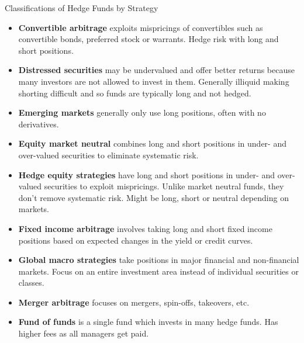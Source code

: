 \documentclass[../custom]{flashcards}
\newcommand{\studyArea}{Alternative Investments}
\begin{document}
\begin{flashcard}[\studyArea]{Classifications of Hedge Funds by Strategy}
    \begin{itemize}[itemsep=.5\itemsep]
        \item \textbf{Convertible arbitrage} exploits mispricings of convertibles such as convertible bonds, preferred stock or warrants. Hedge risk with long and short positions.
        \item \textbf{Distressed securities} may be undervalued and offer better returns because many investors are not allowed to invest in them. Generally illiquid making shorting difficult and so funds are typically long and not hedged.
        \item \textbf{Emerging markets} generally only use long positions, often with no derivatives.
        \item \textbf{Equity market neutral} combines long and short positions in under- and over-valued securities to eliminate systematic risk.
        \item \textbf{Hedge equity strategies} have long and short positions in under- and over-valued securities to exploit mispricings. Unlike market neutral funds, they don't remove systematic risk. Might be long, short or neutral depending on markets.
        \item \textbf{Fixed income arbitrage} involves taking long and short fixed income positions based on expected changes in the yield or credit curves.
        \item \textbf{Global macro strategies} take positions in major financial and non-financial markets. Focus on an entire investment area instead of individual securities or classes.
        \item \textbf{Merger arbitrage} focuses on mergers, spin-offs, takeovers, etc.
        \item \textbf{Fund of funds} is a single fund which invests in many hedge funds. Has higher fees as all managers get paid.
    \end{itemize}
\end{flashcard}
\end{document}
